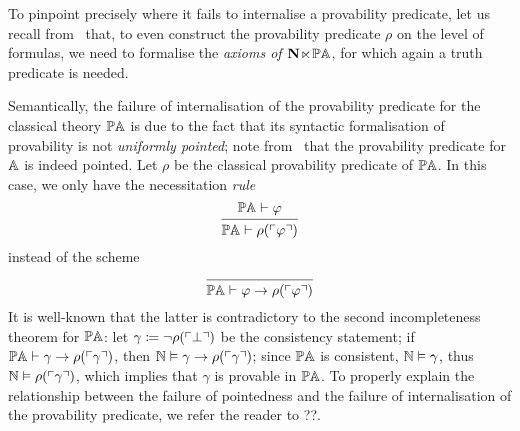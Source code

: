 To pinpoint precisely where it fails to internalise a provability predicate, let us recall from~ that, to even construct the provability predicate $\rho$ on the level of formulas, we need to formalise the \emph{axioms of $\mathbf N\hspace{-.4ex}\ltimes\hspace{-.4ex}\mathbb{PA}$}, for which again a truth predicate is needed. 

\begin{remark}
  Semantically, the failure of internalisation of the provability predicate for the classical theory $\mathbb{PA}$ is due to the fact that its syntactic formalisation of provability is not \emph{uniformly pointed}; note from~ that the provability predicate for $\mathbb{A}$ is indeed pointed. Let $\rho$ be the classical provability predicate of $\mathbb{PA}$. In this case, we only have the necessitation \emph{rule}
  \[
  \begin{prooftree}
    \hypo{\PA \vdash \varphi}
    \infer1{\PA \vdash \rho(\gn{\varphi})}
  \end{prooftree}
  \]
  instead of the scheme 
  \[
  \begin{prooftree}
    \hypo{}
    \infer1{\PA \vdash \varphi \to \rho(\gn{\varphi})}
  \end{prooftree}
  \]
  It is well-known that the latter is contradictory to the second incompleteness theorem for $\mathbb{PA}$: let $\gamma \coloneq \neg\rho(\ulcorner \bot \urcorner)$ be the consistency statement; if $\mathbb{PA} \vdash \gamma \to \rho(\ulcorner \gamma \urcorner)$, then $\mathbb{N} \vDash \gamma \to \rho(\ulcorner \gamma \urcorner)$; since $\mathbb{PA}$ is consistent, $\mathbb{N} \vDash \gamma$, thus $\mathbb{N} \vDash \rho(\ulcorner \gamma \urcorner)$, which implies that $\gamma$ is provable in $\mathbb{PA}$. To properly explain the relationship between the failure of pointedness and the failure of internalisation of the provability predicate, we refer the reader to ??.
\end{remark}

